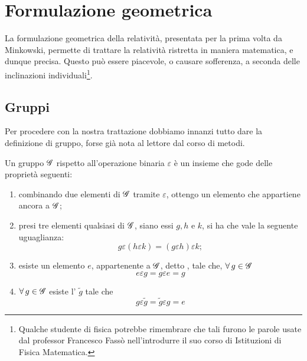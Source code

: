 \chapter{Formulazione geometrica}
\minitoc La formulazione geometrica della relativit\`a, presentata per
la prima volta da Minkowski, permette di trattare la relativit\`a
ristretta in maniera matematica, e dunque precisa. Questo pu\`o essere
piacevole, o causare sofferenza, a seconda delle inclinazioni
individuali\footnote{Qualche studente di fisica potrebbe rimembrare che
tali furono le parole usate dal professor Francesco Fass\`o
nell'introdurre il suo corso di Istituzioni di Fisica Matematica.}.
\section{Gruppi}
Per procedere con la nostra trattazione dobbiamo innanzi tutto
dare la definizione di gruppo, forse gi\`a nota al lettore dal corso
di metodi.

\setcounter{teorema}{-1}

\begin{definizione}
Un gruppo $\mathscr{G}$ rispetto all'operazione binaria $\varepsilon$ \`e un
insieme che gode delle propriet\`a seguenti:
\begin{enumerate}
\item combinando due elementi di $\mathscr{G}$ tramite $\varepsilon$, ottengo
      un elemento che appartiene ancora a $\mathscr{G}$;
\item presi tre elementi qualsiasi di $\mathscr{G}$, siano essi $g,h$ e $k$,
      si ha che vale la seguente uguaglianza:
\begin{equation}
 g\varepsilon(h\varepsilon k) = (g \varepsilon h) \varepsilon k;
\end{equation}
\item esiste un elemento $e$, appartenente a $\mathscr{G}$, detto
      , tale che, $\forall\,g\in\mathscr{G}$
\begin{equation}
 e \varepsilon g = g \varepsilon e = g
\end{equation}

\item $\forall\,g\in\mathscr{G}$ esiste l'
      $\tilde{g}$ tale che
      \begin{equation}
      g \varepsilon \tilde{g} = \tilde{g} \varepsilon g = e
      \end{equation}
\end{enumerate}
\end{definizione}
